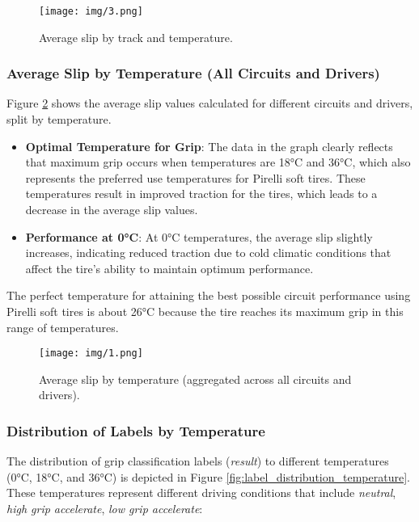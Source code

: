 \documentclass[a4paper,final,12pt]{report}
\begin{document}
\begin{figure}[H]
    \centering
    \texttt{[image: img/3.png]}
    \caption{Average slip by track and temperature.}
    \label{fig:average_slip_track_temp}
\end{figure}

\subsubsection{Average Slip by Temperature (All Circuits and Drivers)}
Figure \ref{fig:average_slip_temp}  shows the average slip values calculated for different circuits and drivers, split by temperature.

\begin{itemize}
    \item \textbf{Optimal Temperature for Grip}: 
    The data in the graph clearly reflects that maximum grip occurs when temperatures are 18°C and 36°C, which also represents the preferred use temperatures for Pirelli soft tires. These temperatures result in improved traction for the tires, which leads to a decrease in the average slip values.
    \item \textbf{Performance at 0°C}: 
    At 0°C temperatures, the average slip slightly increases, indicating reduced traction due to cold climatic conditions that affect the tire's ability to maintain optimum performance.
\end{itemize}
The perfect temperature for attaining the best possible circuit performance using Pirelli soft tires is about 26°C because the tire reaches its maximum grip in this range of temperatures.

\begin{figure}[H]
    \centering
    \texttt{[image: img/1.png]}
    \caption{Average slip by temperature (aggregated across all circuits and drivers).}
    \label{fig:average_slip_temp}
\end{figure}


\subsubsection{Distribution of Labels by Temperature}
The distribution of grip classification labels (\textit{result}) to different temperatures (0°C, 18°C, and 36°C) is depicted in Figure \ref{fig:label_distribution_temperature}. These temperatures represent different driving conditions that include \textit{neutral}, \textit{high grip accelerate}, \textit{low grip accelerate}: \\\\\\
\end{document}
